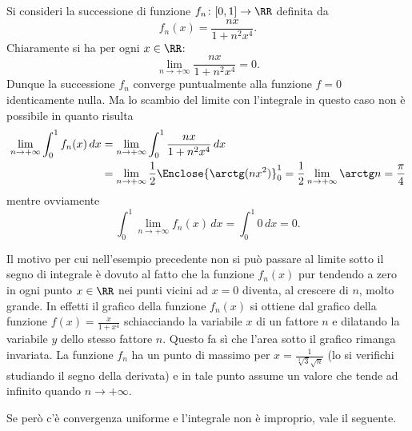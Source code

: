 \begin{example}
Si consideri la successione di funzione $f_n\colon[0,1]\to\RR$ definita da 
\[
 f_n(x) = \frac{nx}{1+n^2x^4}.  
\]
Chiaramente si ha per ogni $x\in \RR$:
\[
  \lim_{n\to+\infty} \frac{nx}{1+n^2x^4} = 0.
\]
Dunque la successione $f_n$ converge puntualmente alla funzione $f=0$ identicamente nulla.
Ma lo scambio del limite con l'integrale in questo caso 
non è possibile in quanto risulta 
\begin{align*}
\lim_{n\to +\infty} \int_0^1 f_n(x)\, dx 
&= \lim_{n\to +\infty} \int_0^1 \frac{nx}{1+n^2x^4}\, dx \\
&=\lim_{n\to +\infty} \frac 1 2 \Enclose{\arctg(nx^2)}_0^1 
 = \frac 1 2 \lim_{n\to +\infty} \arctg n = \frac \pi 4 
\end{align*}
mentre ovviamente 
\[
 \int_0^1 \lim_{n\to +\infty} f_n(x)\, dx = \int_0^1 0\, dx = 0.
\]
\end{example}

Il motivo per cui nell'esempio precedente non si può passare 
al limite sotto il segno di integrale è dovuto al fatto che la funzione 
$f_n(x)$ pur tendendo a zero in ogni punto $x\in \RR$ nei punti vicini 
ad $x=0$ diventa, al crescere di $n$, molto grande.
In effetti il grafico della funzione $f_n(x)$ si ottiene dal grafico 
della funzione $f(x) = \frac{x}{1+x^4}$ schiacciando la variabile $x$ 
di un fattore $n$ e dilatando la variabile $y$ dello stesso fattore $n$.
Questo fa sì che l'area sotto il grafico rimanga invariata.
La funzione $f_n$ ha un punto di massimo per $x=\frac{1}{\sqrt[4]3 \sqrt n}$
(lo si verifichi studiando il segno della derivata) e in tale 
punto assume un valore che tende ad infinito quando $n\to +\infty$.

Se però c'è convergenza uniforme e l'integrale non è improprio, 
vale il seguente.

